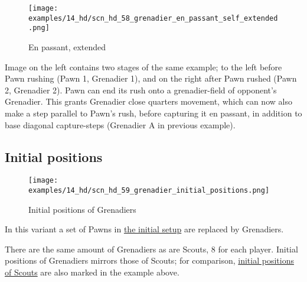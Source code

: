 \vspace*{3.1\baselineskip}
\noindent
\begin{wrapfigure}[15]{l}{0.4\textwidth}
\centering
\texttt{[image: examples/14\_hd/scn\_hd\_58\_grenadier\_en\_passant\_self\_extended.png]}
\vspace*{-1.4\baselineskip}
\caption{En passant, extended}
\label{fig:scn_hd_58_grenadier_en_passant_self_extended}
\end{wrapfigure}
Image on the left contains two stages of the same example; to the left before Pawn
rushing (Pawn 1, Grenadier 1), and on the right after Pawn rushed (Pawn 2, Grenadier
2). \newline
\indent
Pawn can end its rush onto a grenadier-field of opponent's Grenadier. This grants
Grenadier close quarters movement, which can now also make a step parallel to Pawn's
rush, before capturing it en passant, in addition to base diagonal capture-steps
(Grenadier A in previous example).

\clearpage %

\subsection*{Initial positions}
\label{sec:Hemera's Dawn/Grenadier/Initial positions}

\vspace*{-1.2\baselineskip}
\noindent
\begin{figure}[!h]
\texttt{[image: examples/14\_hd/scn\_hd\_59\_grenadier\_initial\_positions.png]}
\vspace*{-1.3\baselineskip}
\caption{Initial positions of Grenadiers}
\label{fig:scn_hd_59_grenadier_initial_positions}
\end{figure}

\vspace*{-0.5\baselineskip}
In this variant a set of Pawns in
\hyperref[fig:14_hemera_s_dawn]{the initial setup} are replaced by Grenadiers.

There are the same amount of Grenadiers as are Scouts, 8 for each player.
Initial positions of Grenadiers mirrors those of Scouts; for comparison,
\hyperref[fig:scn_hd_39_scout_initial_positions]{initial positions of Scouts}
are also marked in the example above.

\clearpage %

